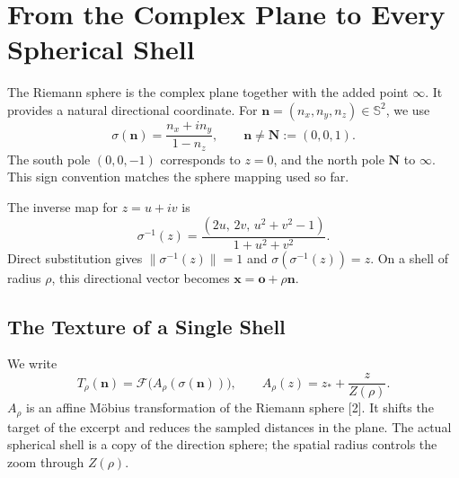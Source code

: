 \documentclass[11pt,a4paper]{article}
\numberwithin{equation}{section}
\newcommand{\Sph}{\mathbb S^2}
\newcommand{\vct}[1]{\boldsymbol{#1}}
\newcommand{\F}{\mathcal F}
\begin{document}
\newpage
\section{From the Complex Plane to Every Spherical Shell}
The Riemann sphere is the complex plane together with the added point
$\infty$. It provides a natural directional coordinate.
For $\vct n=(n_x,n_y,n_z)\in\Sph$, we use
\begin{equation}\label{eq:stereo}
 \sigma(\vct n)=\frac{n_x+i n_y}{1-n_z},\qquad
 \vct n\ne\vct N:=(0,0,1).
\end{equation}
The south pole $(0,0,-1)$ corresponds to $z=0$, and the north pole $\vct N$ to
$\infty$. This sign convention matches the sphere mapping used so far.

\begin{center}
\end{center}

The inverse map for $z=u+iv$ is
\begin{equation}
 \sigma^{-1}(z)=\frac{(2u,\,2v,\,u^2+v^2-1)}{1+u^2+v^2}.
\end{equation}
Direct substitution gives $\|\sigma^{-1}(z)\|=1$ and
$\sigma(\sigma^{-1}(z))=z$. On a shell of radius $\rho$,
this directional vector becomes $\vct x=\vct o+\rho\vct n$.

\subsection{The Texture of a Single Shell}
We write
\begin{equation}\label{eq:shell}
 T_\rho(\vct n)=\F\bigl(A_\rho(\sigma(\vct n))\bigr),\qquad
 A_\rho(z)=z_\ast+\frac{z}{Z(\rho)}.
\end{equation}
$A_\rho$ is an affine Möbius transformation of the Riemann sphere [2].
It shifts the target of the excerpt and reduces the sampled distances in the plane.
The actual spherical shell is a copy of the direction sphere; the spatial radius
controls the zoom through $Z(\rho)$.
\end{document}
